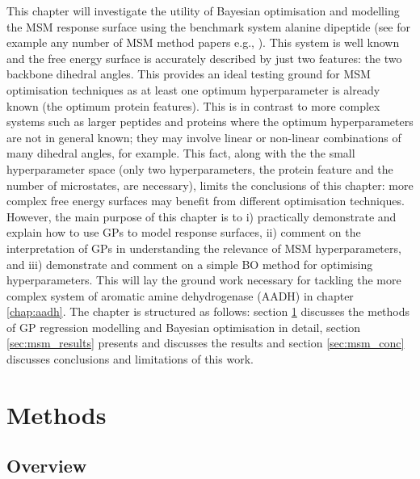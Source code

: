 This chapter will investigate the utility of Bayesian optimisation and modelling the MSM response surface using the benchmark system alanine dipeptide (see for example any number of MSM method papers e.g.,  \cite{wehmeyerTimelaggedAutoencodersDeep2018a,nuskeVariationalApproachMolecular2014,bowmanQuantitativeComparisonAlternative2013}). This system is well known and the free energy surface is accurately described by just two features: the two backbone dihedral angles. This provides an ideal testing ground for MSM optimisation techniques as at least one optimum hyperparameter is already known (the optimum protein features).  This is in contrast to more complex systems such as larger peptides and proteins where the optimum hyperparameters are not in general known;  they may involve linear or non-linear combinations of many dihedral angles, for example.  This fact, along with the the small hyperparameter space (only two hyperparameters, the protein feature and the number of microstates, are necessary), limits the conclusions of this chapter:  more complex free energy surfaces may benefit from different optimisation techniques.  However, the main purpose of this chapter is to i) practically demonstrate and explain how to use GPs to model response surfaces, ii) comment on the interpretation of GPs in understanding the relevance of MSM hyperparameters, and iii) demonstrate and comment on a simple BO method for optimising hyperparameters. This will lay the ground work necessary for tackling the more complex  system of aromatic amine dehydrogenase (AADH) in chapter \ref{chap:aadh}. The chapter is structured as follows: section \ref{sec:msm_methods} discusses the methods of GP regression modelling and Bayesian optimisation in detail, section \ref{sec:msm_results} presents and discusses the results and section \ref{sec:msm_conc} discusses conclusions and limitations of this work. 

\section{Methods}\label{sec:msm_methods}

\subsection{Overview}

